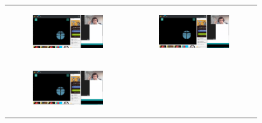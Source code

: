 \begin{figure}[!h]
  \centering
  \begin{tabular}[c]{cc}
    \begin{subfigure}[c]{0.5\textwidth}
      \includegraphics[width=\textwidth]{imaxes/juego1.png}
      
    \end{subfigure}&
    \begin{subfigure}[c]{0.5\textwidth}
      \includegraphics[width=\textwidth]{imaxes/juego2.png}
      
      
    \end{subfigure}\\
    \begin{subfigure}[c]{0.5\textwidth}
      \includegraphics[width=\textwidth]{imaxes/juego3.png}
      

\end{subfigure}
\end{tabular}
\end{figure}

